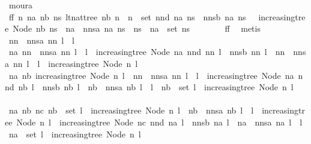 \begin{isabellebody}
\ moura\isanewline
\ \ \ \ \isamarkupfalse%
\ \isamarkupfalse%
\ ff{}{\isacharcolon}\ {\isachardoublequoteopen}{\isasymforall}n\ na\ nb\ ns{\isachardot}\ lt{\isacharunderscore}nat{\isacharunderscore}tree\ nb\ n\ {\isasymor}\ n\ {\isasymnotin}\ set\ {\isacharparenleft}nnd\ na\ ns\ {\isacharhash}\ nnsb\ na\ ns{\isacharparenright}\ {\isasymor}\ {\isasymnot}\ increasing{\isacharunderscore}tree\ {\isacharparenleft}Node\ nb\ ns{\isacharparenright}\ {\isasymor}\ na\ {\isacharhash}\ nnsa\ na\ ns\ {\isacharequal}\ ns\ {\isasymor}\ na\ {\isasymnotin}\ set\ ns{\isachardoublequoteclose}\isanewline
\ \ \ \ \ \ \isamarkupfalse%
\ ff{}\ \isamarkupfalse%
\ metis\isanewline
\ \ \ \ \isacommand{{\isacharbraceleft}}\isamarkupfalse%
\ \isamarkupfalse%
\ {\isachardoublequoteopen}nn\ {\isacharhash}\ nnsa\ nn\ l\ {\isasymnoteq}\ l{\isachardoublequoteclose}\isanewline
\ \ \ \ \ \ \isacommand{{\isacharbraceleft}}\isamarkupfalse%
\ \isamarkupfalse%
\ {\isachardoublequoteopen}{\isasymexists}na{\isachardot}\ nn\ {\isacharhash}\ nnsa\ nn\ l\ {\isasymnoteq}\ l\ {\isasymand}\ increasing{\isacharunderscore}tree\ {\isacharparenleft}Node\ na\ {\isacharparenleft}nnd\ nn\ l\ {\isacharhash}\ nnsb\ nn\ l{\isacharparenright}{\isacharparenright}\ {\isasymand}\ nn\ {\isacharhash}\ nnsa\ nn\ l\ {\isasymnoteq}\ l\ {\isasymand}\ increasing{\isacharunderscore}tree\ {\isacharparenleft}Node\ n\ l{\isacharparenright}{\isachardoublequoteclose}\isanewline
\ \ \ \ \ \ \ \ \isamarkupfalse%
\isanewline
\ \ \ \ \ \ \ \ \isacommand{{\isacharbraceleft}}\isamarkupfalse%
\ \isamarkupfalse%
\ {\isachardoublequoteopen}{\isasymexists}na\ nb{\isachardot}\ increasing{\isacharunderscore}tree\ {\isacharparenleft}Node\ n\ l{\isacharparenright}\ {\isasymand}\ nn\ {\isacharhash}\ nnsa\ nn\ l\ {\isasymnoteq}\ l\ {\isasymand}\ increasing{\isacharunderscore}tree\ {\isacharparenleft}Node\ na\ {\isacharparenleft}nnd\ nb\ l\ {\isacharhash}\ nnsb\ nb\ l{\isacharparenright}{\isacharparenright}\ {\isasymand}\ nb\ {\isacharhash}\ nnsa\ nb\ l\ {\isasymnoteq}\ l\ {\isasymand}\ nb\ {\isasymin}\ set\ l\ {\isasymand}\ increasing{\isacharunderscore}tree\ {\isacharparenleft}Node\ n\ l{\isacharparenright}{\isachardoublequoteclose}\isanewline
\ \ \ \ \ \ \ \ \ \ \isamarkupfalse%
\isanewline
\ \ \ \ \ \ \ \ \ \ \isacommand{{\isacharbraceleft}}\isamarkupfalse%
\ \isamarkupfalse%
\ {\isachardoublequoteopen}{\isasymexists}na\ nb\ nc{\isachardot}\ nb\ {\isasymin}\ set\ l\ {\isasymand}\ increasing{\isacharunderscore}tree\ {\isacharparenleft}Node\ n\ l{\isacharparenright}\ {\isasymand}\ nb\ {\isacharhash}\ nnsa\ nb\ l\ {\isasymnoteq}\ l\ {\isasymand}\ increasing{\isacharunderscore}tree\ {\isacharparenleft}Node\ n\ l{\isacharparenright}\ {\isasymand}\ increasing{\isacharunderscore}tree\ {\isacharparenleft}Node\ nc\ {\isacharparenleft}nnd\ na\ l\ {\isacharhash}\ nnsb\ na\ l{\isacharparenright}{\isacharparenright}\ {\isasymand}\ na\ {\isacharhash}\ nnsa\ na\ l\ {\isasymnoteq}\ l\ {\isasymand}\ na\ {\isasymin}\ set\ l\ {\isasymand}\ increasing{\isacharunderscore}tree\ {\isacharparenleft}Node\ n\ l{\isacharparenright}{\isachardoublequoteclose}\isanewline

\end{isabellebody}

